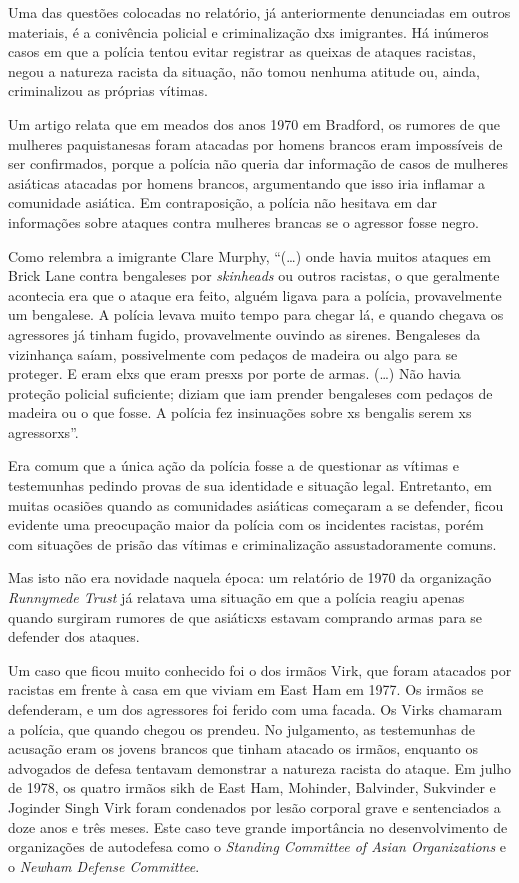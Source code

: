 Uma das questões colocadas no relatório, já anteriormente denunciadas em outros materiais, é a conivência policial e criminalização dxs imigrantes. Há inúmeros casos em que a polícia tentou evitar registrar as queixas de ataques racistas, negou a natureza racista da situação, não tomou nenhuma atitude ou, ainda, criminalizou as próprias vítimas.

Um artigo relata que em meados dos anos 1970 em Bradford, os rumores de que mulheres paquistanesas foram atacadas por homens brancos eram impossíveis de ser confirmados, porque a polícia não queria dar informação de casos de mulheres asiáticas atacadas por homens brancos, argumentando que isso iria inflamar a comunidade asiática. Em contraposição, a polícia não hesitava em dar informações sobre ataques contra mulheres brancas se o agressor fosse negro.


Como relembra a imigrante Clare Murphy, ``(\ldots{}) onde havia muitos ataques em Brick Lane contra bengaleses por \emph{skinheads} ou outros racistas, o que geralmente acontecia era que o ataque era feito, alguém ligava para a polícia, provavelmente um bengalese. A polícia levava muito tempo para chegar lá, e quando chegava os agressores já tinham fugido, provavelmente ouvindo as sirenes. Bengaleses da vizinhança saíam, possivelmente com pedaços de madeira ou algo para se proteger. E eram elxs que eram presxs por porte de armas. (\ldots{}) Não havia proteção policial suficiente; diziam que iam prender bengaleses com pedaços de madeira ou o que fosse. A polícia fez insinuações sobre xs bengalis serem xs agressorxs''.

Era comum que a única ação da polícia fosse a de questionar as vítimas e testemunhas pedindo provas de sua identidade e situação legal. Entretanto, em muitas ocasiões quando as comunidades asiáticas começaram a se defender, ficou evidente uma preocupação maior da polícia com os incidentes racistas, porém com situações de prisão das vítimas e criminalização assustadoramente comuns.

 

Mas isto não era novidade naquela época: um relatório de 1970 da organização \emph{Runnymede Trust} já relatava uma situação em que a polícia reagiu apenas quando surgiram rumores de que asiáticxs estavam comprando armas para se defender dos ataques.

Um caso que ficou muito conhecido foi o dos irmãos Virk, que foram atacados por racistas em frente à casa em que viviam em East Ham em 1977. Os irmãos se defenderam, e um dos agressores foi ferido com uma facada. Os Virks chamaram a polícia, que quando chegou os prendeu. No julgamento, as testemunhas de acusação eram os jovens brancos que tinham atacado os irmãos, enquanto os advogados de defesa tentavam demonstrar a natureza racista do ataque. Em julho de 1978, os quatro irmãos sikh de East Ham, Mohinder, Balvinder, Sukvinder e Joginder Singh Virk foram condenados por lesão corporal grave e sentenciados a doze anos e três meses. Este caso teve grande importância no desenvolvimento de organizações de autodefesa como o \emph{Standing Committee of Asian Organizations} e o \emph{Newham Defense Committee}.


